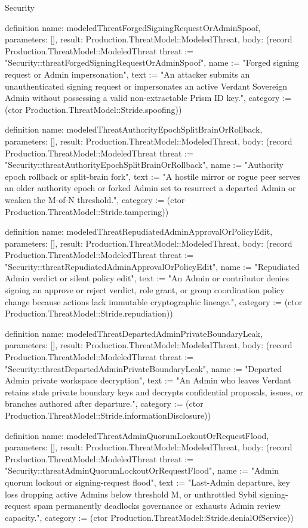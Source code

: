 \begin{lexlean}{Security}
\begin{semanticmodule}
definition{
  name: modeledThreatForgedSigningRequestOrAdminSpoof,
  parameters: [],
  result: Production.ThreatModel::ModeledThreat,
  body: (record Production.ThreatModel::ModeledThreat {threat := "Security::threatForgedSigningRequestOrAdminSpoof", name := "Forged signing request or Admin impersonation", text := "An attacker submits an unauthenticated signing request or impersonates an active Verdant Sovereign Admin without possessing a valid non-extractable Prism ID key.", category := (ctor Production.ThreatModel::Stride.spoofing)})
}

definition{
  name: modeledThreatAuthorityEpochSplitBrainOrRollback,
  parameters: [],
  result: Production.ThreatModel::ModeledThreat,
  body: (record Production.ThreatModel::ModeledThreat {threat := "Security::threatAuthorityEpochSplitBrainOrRollback", name := "Authority epoch rollback or split-brain fork", text := "A hostile mirror or rogue peer serves an older authority epoch or forked Admin set to resurrect a departed Admin or weaken the M-of-N threshold.", category := (ctor Production.ThreatModel::Stride.tampering)})
}

definition{
  name: modeledThreatRepudiatedAdminApprovalOrPolicyEdit,
  parameters: [],
  result: Production.ThreatModel::ModeledThreat,
  body: (record Production.ThreatModel::ModeledThreat {threat := "Security::threatRepudiatedAdminApprovalOrPolicyEdit", name := "Repudiated Admin verdict or silent policy edit", text := "An Admin or contributor denies signing an approve or reject verdict, role grant, or group coordination policy change because actions lack immutable cryptographic lineage.", category := (ctor Production.ThreatModel::Stride.repudiation)})
}

definition{
  name: modeledThreatDepartedAdminPrivateBoundaryLeak,
  parameters: [],
  result: Production.ThreatModel::ModeledThreat,
  body: (record Production.ThreatModel::ModeledThreat {threat := "Security::threatDepartedAdminPrivateBoundaryLeak", name := "Departed Admin private workspace decryption", text := "An Admin who leaves Verdant retains stale private boundary keys and decrypts confidential proposals, issues, or branches authored after departure.", category := (ctor Production.ThreatModel::Stride.informationDisclosure)})
}

definition{
  name: modeledThreatAdminQuorumLockoutOrRequestFlood,
  parameters: [],
  result: Production.ThreatModel::ModeledThreat,
  body: (record Production.ThreatModel::ModeledThreat {threat := "Security::threatAdminQuorumLockoutOrRequestFlood", name := "Admin quorum lockout or signing-request flood", text := "Last-Admin departure, key loss dropping active Admins below threshold M, or unthrottled Sybil signing-request spam permanently deadlocks governance or exhausts Admin review capacity.", category := (ctor Production.ThreatModel::Stride.denialOfService)})
}


\end{semanticmodule}
\end{lexlean}
